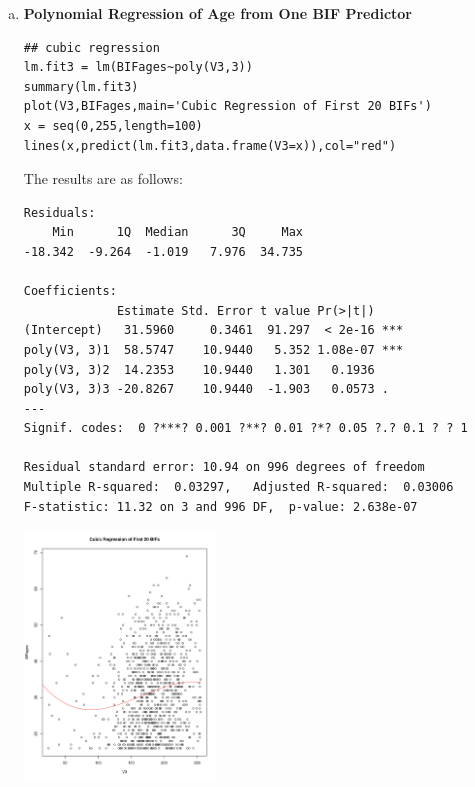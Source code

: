\documentclass{article}
\begin{document}
\begin{enumerate}[a)]
\item \textbf{Polynomial Regression of Age from One BIF Predictor}
\begin{verbatim}
## cubic regression
lm.fit3 = lm(BIFages~poly(V3,3))
summary(lm.fit3)
plot(V3,BIFages,main='Cubic Regression of First 20 BIFs')
x = seq(0,255,length=100)
lines(x,predict(lm.fit3,data.frame(V3=x)),col="red")
\end{verbatim}
The results are as follows:\\
\begin{verbatim}
Residuals:
    Min      1Q  Median      3Q     Max 
-18.342  -9.264  -1.019   7.976  34.735 

Coefficients:
             Estimate Std. Error t value Pr(>|t|)    
(Intercept)   31.5960     0.3461  91.297  < 2e-16 ***
poly(V3, 3)1  58.5747    10.9440   5.352 1.08e-07 ***
poly(V3, 3)2  14.2353    10.9440   1.301   0.1936    
poly(V3, 3)3 -20.8267    10.9440  -1.903   0.0573 .  
---
Signif. codes:  0 ?***? 0.001 ?**? 0.01 ?*? 0.05 ?.? 0.1 ? ? 1

Residual standard error: 10.94 on 996 degrees of freedom
Multiple R-squared:  0.03297,	Adjusted R-squared:  0.03006 
F-statistic: 11.32 on 3 and 996 DF,  p-value: 2.638e-07
\end{verbatim}
\includegraphics[width=0.4\textwidth]{E1c.pdf}\\

\end{enumerate}
\end{document}
